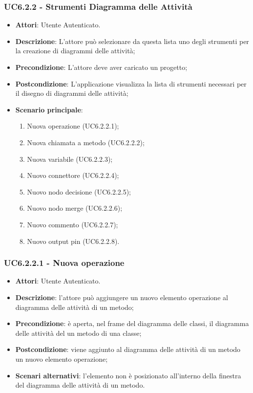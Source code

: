 \subsubsection{UC6.2.2 - Strumenti Diagramma delle Attività} 
\label{sssec:UC6.2.2} 
\begin{itemize} 
\item \textbf{Attori}: Utente Autenticato.
\item \textbf{Descrizione}: L'attore può selezionare da questa lista uno degli strumenti per la creazione di diagrammi delle attività;
\item \textbf{Precondizione}: L'attore deve aver caricato un progetto;
\item \textbf{Postcondizione}: L'applicazione visualizza la lista di strumenti necessari per il disegno di diagrammi delle attività;
\item \textbf{Scenario principale}: \begin{enumerate}\item Nuova operazione (UC6.2.2.1);\item Nuova chiamata a metodo (UC6.2.2.2);\item Nuova variabile (UC6.2.2.3);\item Nuovo connettore (UC6.2.2.4);\item Nuovo nodo decisione (UC6.2.2.5);\item Nuovo nodo merge (UC6.2.2.6);\item Nuovo commento (UC6.2.2.7);\item Nuovo output pin (UC6.2.2.8). 
 \end{enumerate}
\end{itemize} 
\subsubsection{UC6.2.2.1 - Nuova operazione} 
\label{sssec:UC6.2.2.1} 
\begin{itemize} 
\item \textbf{Attori}: Utente Autenticato.
\item \textbf{Descrizione}: l'attore può aggiungere un nuovo elemento operazione al diagramma delle attività di un metodo;
\item \textbf{Precondizione}: è aperta, nel frame del diagramma delle  classi, il diagramma delle attività del un metodo di una classe;
\item \textbf{Postcondizione}: viene aggiunto al diagramma delle attività di un metodo un nuovo elemento operazione;
\item \textbf{Scenari alternativi}: l'elemento non è posizionato all'interno della finestra del diagramma delle attività di un metodo.
\end{itemize} 
